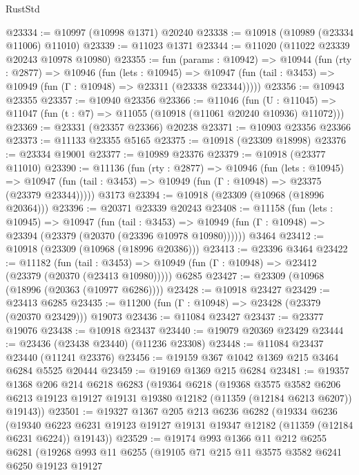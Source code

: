 \begin{lexlean}{RustStd}
\begin{coremodule}
{{{{{{{{{{{{{{{{{{{@23334 := @10997 (@10998 @1371) @20240
@23338 := @10918 (@10989 (@23334 @11006) @11010)
@23339 := @11023 @1371
@23344 := @11020 (@11022 @23339 @20243 @10978 @10980)
@23355 := fun (params : @10942) =>
  @10944
    (fun (rty : @2877) =>
    @10946
      (fun (lets : @10945) =>
      @10947 (fun (tail : @3453) => @10949 (fun (Γ : @10948) => @23311 (@23338 @23344)))))
@23356 := @10943 @23355
@23357 := @10940 @23356
@23366 := @11046
    (fun (U : @11045) => @11047 (fun (t : @7) => @11055 (@10918 (@11061 @20240 @10936) @11072)))
@23369 := @23331 (@23357 @23366) @20238
@23371 := @10903 @23356 @23366
@23373 := @11133 @23355 @5165
@23375 := @10918 (@23309 @18998)
@23376 := @23334 @19001
@23377 := @10989 @23376
@23379 := @10918 (@23377 @11010)
@23390 := @11136
    (fun (rty : @2877) =>
    @10946
      (fun (lets : @10945) =>
      @10947 (fun (tail : @3453) => @10949 (fun (Γ : @10948) => @23375 (@23379 @23344)))))
    @3173
@23394 := @10918 (@23309 (@10968 (@18996 @20364)))
@23396 := @20371 @23339 @20243
@23408 := @11158
    (fun (lets : @10945) =>
    @10947
      (fun (tail : @3453) =>
      @10949 (fun (Γ : @10948) => @23394 (@23379 (@20370 (@23396 @10978 @10980))))))
    @3464
@23412 := @10918 (@23309 (@10968 (@18996 @20386)))
@23413 := @23396 @3464
@23422 := @11182
    (fun (tail : @3453) => @10949 (fun (Γ : @10948) => @23412 (@23379 (@20370 (@23413 @10980)))))
    @6285
@23427 := @23309 (@10968 (@18996 (@20363 (@10977 @6286))))
@23428 := @10918 @23427
@23429 := @23413 @6285
@23435 := @11200 (fun (Γ : @10948) => @23428 (@23379 (@20370 @23429))) @19073
@23436 := @11084 @23427
@23437 := @23377 @19076
@23438 := @10918 @23437
@23440 := @19079 @20369 @23429
@23444 := @23436 (@23438 @23440) (@11236 @23308)
@23448 := @11084 @23437 @23440 (@11241 @23376)
@23456 := @19159 @367 @1042 @1369 @215 @3464 @6284 @5525 @20444
@23459 := @19169 @1369 @215 @6284
@23481 := @19357
    @1368
    @206
    @214
    @6218
    @6283
    (@19364
      @6218
      (@19368
        @3575
        @3582
        @6206
        @6213
        @19123
        @19127
        @19131
        @19380
        @12182
        (@11359 (@12184 @6213 @6207))
        @19143))
@23501 := @19327
    @1367
    @205
    @213
    @6236
    @6282
    (@19334
      @6236
      (@19340 @6223 @6231 @19123 @19127 @19131 @19347 @12182 (@11359 (@12184 @6231 @6224)) @19143))
@23529 := @19174
    @993
    @1366
    @11
    @212
    @6255
    @6281
    (@19268
      @993
      @11
      @6255
      (@19105
        @71
        @215
        @11
        @3575
        @3582
        @6241
        @6250
        @19123
        @19127
}}}}}}}}}}}}}}}}}}}
\end{coremodule}
\end{lexlean}
